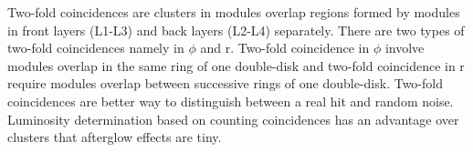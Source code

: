 Two-fold coincidences are clusters in modules overlap regions formed by modules in front layers (L1-L3) and back layers (L2-L4) separately. There are two types of two-fold coincidences namely in $\phi$ and r. Two-fold coincidence in $\phi$ involve modules overlap in the same ring of one double-disk and two-fold coincidence in r require modules overlap between successive rings of one double-disk.  Two-fold coincidences are better way to distinguish between a real hit and random noise. %
Luminosity determination based on counting coincidences has an advantage over clusters that afterglow effects are tiny. %

